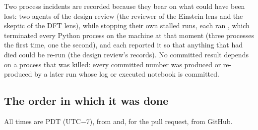 Two process incidents are recorded because they bear on what could have been lost: two agents of the design review (the reviewer of the Einstein lens and the skeptic of the DFT lens), while stopping their own stalled runs, each ran , which terminated every Python process on the machine at that moment (three processes the first time, one the second), and each reported it so that anything that had died could be re-run (the design review's records). No committed result depends on a process that was killed: every committed number was produced or re-produced by a later run whose log or executed notebook is committed.

\subsection{The order in which it was done}
\label{sec:0.4}

All times are PDT (UTC\ensuremath{-}7), from  and, for the pull request, from GitHub.

